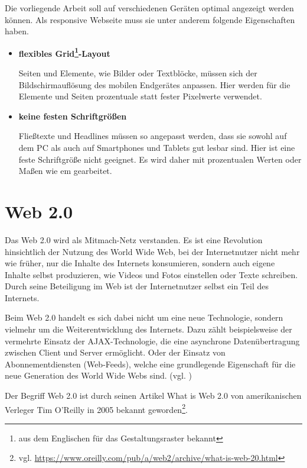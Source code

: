 Die vorliegende Arbeit soll auf verschiedenen Geräten optimal angezeigt werden können. Als \glqq responsive\grqq{} Webseite muss sie unter anderem folgende Eigenschaften haben.

\begin{itemize}
\item \textbf{flexibles Grid\footnote{aus dem Englischen für das Gestaltungsraster bekannt}-Layout}\par
Seiten und Elemente, wie Bilder oder Textblöcke, müssen sich der Bildschirmauflösung des mobilen Endgerätes anpassen. Hier werden für die Elemente und Seiten prozentuale statt fester Pixelwerte verwendet.
\item \textbf{keine festen Schriftgrößen}\par
Fließtexte und Headlines müssen so angepasst werden, dass sie sowohl auf dem PC als auch auf Smartphones und Tablets gut lesbar sind. Hier ist eine feste Schriftgröße nicht geeignet. Es wird daher mit prozentualen Werten oder Maßen wie em gearbeitet.
\end{itemize}

\section{Web 2.0}
\label{sec:web2.0}
Das Web 2.0 wird als \glqq Mitmach-Netz\grqq{} verstanden. Es ist eine Revolution hinsichtlich der Nutzung des World Wide Web, bei der Internetnutzer nicht mehr wie früher, nur die Inhalte des Internets konsumieren, sondern auch eigene Inhalte selbst produzieren, wie Videos und Fotos einstellen oder Texte schreiben. Durch seine Beteiligung im Web ist der Internetnutzer selbst ein Teil des Internets.\bigskip 

Beim Web 2.0 handelt es sich dabei nicht um eine neue Technologie, sondern vielmehr um die Weiterentwicklung des Internets. Dazu zählt beispielsweise der vermehrte Einsatz der AJAX-Technologie, die eine asynchrone Datenübertragung zwischen Client und Server ermöglicht. Oder der Einsatz von Abonnementdiensten (Web-Feeds), welche eine grundlegende Eigenschaft für die neue Generation des World Wide Webs sind. (vgl. \cite{o.V.2008})\bigskip

Der Begriff Web 2.0 ist durch seinen Artikel \glqq What is Web 2.0\grqq{} von amerikanischen Verleger Tim O’Reilly in 2005 bekannt geworden\footnote{vgl. \url{https://www.oreilly.com/pub/a/web2/archive/what-is-web-20.html}}.


